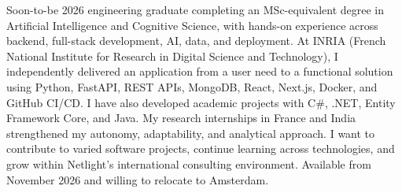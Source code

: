 
\begin{cvparagraph}
Soon-to-be 2026 engineering graduate completing an MSc-equivalent degree in Artificial Intelligence and Cognitive Science, with hands-on experience across backend, full-stack development, AI, data, and deployment. At INRIA (French National Institute for Research in Digital Science and Technology), I independently delivered an application from a user need to a functional solution using Python, FastAPI, REST APIs, MongoDB, React, Next.js, Docker, and GitHub CI/CD. I have also developed academic projects with C\#, .NET, Entity Framework Core, and Java. My research internships in France and India strengthened my autonomy, adaptability, and analytical approach. I want to contribute to varied software projects, continue learning across technologies, and grow within Netlight’s international consulting environment. Available from November 2026 and willing to relocate to Amsterdam.
\end{cvparagraph}
